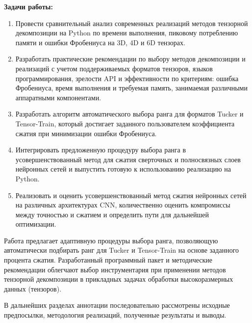 \noindent\textbf{Задачи работы:}
\begin{enumerate}
  \item Провести сравнительный анализ современных реализаций методов тензорной декомпозиции на Python по времени выполнения, пиковому потреблению памяти и ошибки Фробениуса на 3D, 4D и 6D тензорах.
  \item Разработать практические рекомендации по выбору методов декомпозиции и реализаций с учетом поддерживаемых форматов тензоров, языков программирования, зрелости API и эффективности по критериям: ошибка Фробениуса, время выполнения и требуемая память, занимаемая различными аппаратными компонентами.
  \item Разработать алгоритм автоматического выбора ранга для форматов Tucker и Tensor-Train, который достигает заданного пользователем коэффициента сжатия при минимизации ошибки Фробениуса.
  \item Интегрировать предложенную процедуру выбора ранга в усовершенствованный метод для сжатия сверточных и полносвязных слоев нейронных сетей и выпустить готовую к использованию реализацию на Python.
  \item Реализовать и оценить усовершенствованный метод сжатия нейронных сетей на различных архитектурах CNN, количественно оценить компромиссы между точностью и сжатием и определить пути для дальнейшей оптимизации.
\end{enumerate}

Работа предлагает адаптивную процедуры выбора ранга, позволяющую автоматически подбирать ранг для Tucker и Tensor-Train на основе заданного процента сжатия. Разработанный программный пакет и методические рекомендации облегчают выбор инструментария при применении методов тензорной декомпозиции в прикладных задачах обработки высокоразмерных данных (тензоров).

В дальнейших разделах аннотации последовательно рассмотрены исходные предпосылки, методология реализаций, полученные результаты и выводы.